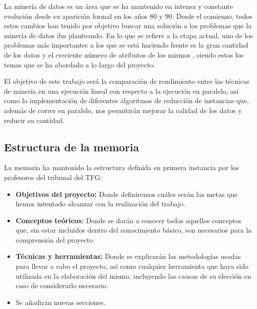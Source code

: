

La minería de datos es un área que se ha mantenido en intensa y constante evolución desde su aparición formal en los años 80 y 90. Desde el comienzo, todos estos cambios han tenido por objetivo buscar una solución a los problemas que la minería de datos iba planteando. En lo que se refiere a la etapa actual, uno de los problemas más importantes a los que se está haciendo frente es la gran cantidad de los datos y el creciente número de atributos de los mismos \cite{DataMiningConcepts}, siendo estos los temas que se ha abordado a lo largo del proyecto.

El objetivo de este trabajo será la comparación de rendimiento entre las técnicas de minería en una ejecución lineal con respecto a la ejecución en paralelo, así como la implementación de diferentes algoritmos de reducción de instancias que, además de correr en paralelo, nos permitirán mejorar la calidad de los datos y reducir su cantidad.

\subsection{Estructura de la memoria}
	La memoria ha mantenido la estructura definida en primera instancia por los profesores del tribunal del TFG:
	\begin{itemize}
	\item \textbf{Objetivos del proyecto:} Donde definiremos cuáles serán las metas que hemos intentado alcanzar con la realización del trabajo.
	\item \textbf{Conceptos teóricos:} Donde se darán a conocer todos aquellos conceptos que, sin estar incluidos dentro del conocimiento básico, son necesarios para la comprensión del proyecto.
	\item \textbf{Técnicas y herramientas:} Donde se explicarán las metodologías usadas para llevar a cabo el proyecto, así como cualquier herramienta que haya sido utilizada en la elaboración del mismo, incluyendo las causas de su elección en caso de considerarlo necesario.
	\item Se añadirán nuevas secciones. 
	\end{itemize}

